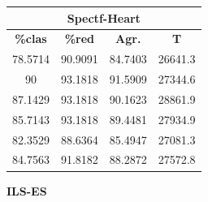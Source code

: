 \documentclass[11pt,a4paper]{article}
\theoremstyle{definition}
\begin{document}
\begin{tabbing}
{		\begin{tabular}{|c|c|c|c|}
			\hline
			\multicolumn{4}{|c|}{\textbf{Spectf-Heart}} \\ \hline
			\textbf{\%clas} & \textbf{\%red} & \textbf{Agr.} & \textbf{T} \\ \hline 
			78.5714 & 90.9091 & 84.7403 & 26641.3 \\ \hline
90 & 93.1818 & 91.5909 & 27344.6 \\ \hline
87.1429 & 93.1818 & 90.1623 & 28861.9 \\ \hline
85.7143 & 93.1818 & 89.4481 & 27934.9 \\ \hline
82.3529 & 88.6364 & 85.4947 & 27081.3 \\ \hline
84.7563 & 91.8182 & 88.2872 & 27572.8 \\ \hline
		\end{tabular}
		}
	\end{tabbing}
	
	\textbf{ILS-ES}
	
\end{document}
